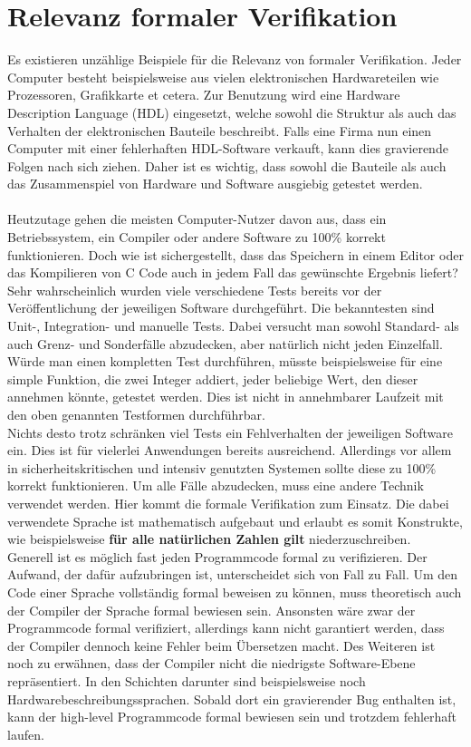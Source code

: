 \section{Relevanz formaler Verifikation}
Es existieren unzählige Beispiele für die Relevanz von formaler Verifikation. Jeder Computer besteht beispielsweise aus vielen elektronischen Hardwareteilen wie Prozessoren, Grafikkarte et cetera. Zur Benutzung wird eine Hardware Description Language (HDL) eingesetzt, welche sowohl die Struktur als auch das Verhalten der elektronischen Bauteile beschreibt. Falls eine Firma nun einen Computer mit einer fehlerhaften HDL-Software verkauft, kann dies gravierende Folgen nach sich ziehen.
Daher ist es wichtig, dass sowohl die Bauteile als auch das Zusammenspiel von Hardware und Software ausgiebig getestet werden.\\
\\
Heutzutage gehen die meisten Computer-Nutzer davon aus, dass ein Betriebssystem, ein Compiler oder andere Software zu 100\% korrekt funktionieren. Doch wie ist sichergestellt, dass das Speichern in einem Editor oder das Kompilieren von C Code auch in jedem Fall das gewünschte Ergebnis liefert? \\
Sehr wahrscheinlich wurden viele verschiedene Tests bereits vor der Veröffentlichung der jeweiligen Software durchgeführt. Die bekanntesten sind Unit-, Integration- und manuelle Tests. Dabei versucht man sowohl Standard- als auch Grenz- und Sonderfälle abzudecken, aber natürlich nicht jeden Einzelfall. Würde man einen kompletten Test durchführen, müsste beispielsweise für eine simple Funktion, die zwei Integer addiert, jeder beliebige Wert, den dieser annehmen könnte, getestet werden. Dies ist nicht in annehmbarer Laufzeit mit den oben genannten Testformen durchführbar.\\
Nichts desto trotz schränken viel Tests ein Fehlverhalten der jeweiligen Software ein. Dies ist für vielerlei Anwendungen bereits ausreichend. Allerdings vor allem in sicherheitskritischen und intensiv genutzten Systemen sollte diese zu 100\% korrekt funktionieren.
Um alle Fälle abzudecken, muss eine andere Technik verwendet werden. Hier kommt die formale Verifikation zum Einsatz. 
Die dabei verwendete Sprache ist mathematisch aufgebaut und erlaubt es somit Konstrukte, wie beispielsweise \textbf{für alle natürlichen Zahlen gilt} niederzuschreiben.\\
Generell ist es möglich fast jeden Programmcode formal zu verifizieren. Der Aufwand, der dafür aufzubringen ist, unterscheidet sich von Fall zu Fall. Um den Code einer Sprache vollständig formal beweisen zu können, muss theoretisch auch der Compiler der Sprache formal bewiesen sein. Ansonsten wäre zwar der Programmcode formal verifiziert, allerdings kann nicht garantiert werden, dass der Compiler dennoch keine Fehler beim Übersetzen macht. Des Weiteren ist noch zu erwähnen, dass der Compiler nicht die niedrigste Software-Ebene repräsentiert. In den Schichten darunter sind beispielsweise noch Hardwarebeschreibungssprachen. Sobald dort ein gravierender Bug enthalten ist, kann der high-level Programmcode formal bewiesen sein und trotzdem fehlerhaft laufen.
